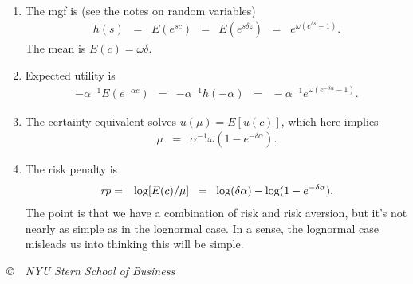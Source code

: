 \documentclass[11pt]{article}
\newcommand{\rp}{\mbox{\it rp\/}}
\begin{document}
\begin{enumerate}
\begin{enumerate}
\item The mgf is (see the notes on random variables)
\begin{eqnarray*}
    h(s) \;\;=\;\;  E(e^{sc}) &=& E(e^{s\delta z}) \;\;=\;\;  e^{\omega (e^{\delta s} -1)} .
\end{eqnarray*}
The mean is $ E(c) = \omega\delta $.

\item Expected utility is
\begin{eqnarray*}
 - \alpha^{-1} E(e^{-\alpha c}) &=& - \alpha^{-1} h(-\alpha)
            \;\;=\;\; - \alpha^{-1} e^{\omega (e^{-\delta\alpha } -1)} .
\end{eqnarray*}

\item The certainty equivalent solves $u(\mu) = E[u(c)]$, which here implies
\begin{eqnarray*}
    \mu &=& \alpha^{-1} \omega (1- e^{-\delta \alpha}) .
\end{eqnarray*}

\item The risk penalty is
\begin{eqnarray*}
    \rp &=& \log [E(c)/\mu]
            \;\;=\;\; \log (\delta \alpha) - \log (1- e^{-\delta \alpha}) .
\end{eqnarray*}
The point is that we have a combination of risk and risk aversion,
but it's not nearly as simple as in the lognormal case.
In a sense, the lognormal case misleads us into thinking this will be simple.
\end{enumerate}



\end{enumerate}



\vfill \centerline{\it \copyright \ \number\year \
NYU Stern School of Business}
\end{document}
